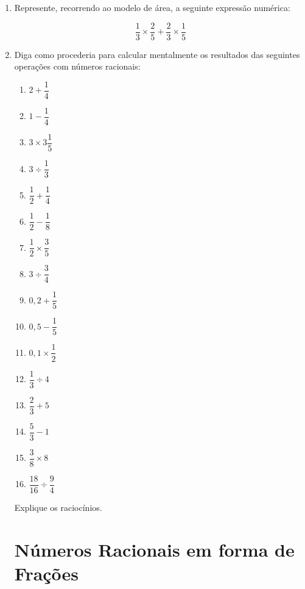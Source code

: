 \begin{enumerate}
\begin{minipage}[h]{14cm}
\begin{center}

\end{center}
\end{minipage}

\item Represente, recorrendo ao modelo de área, a seguinte expressão numérica:

$$\dfrac{1}{3}\times \dfrac{2}{5}+\dfrac{2}{3}\times \dfrac{1}{5}$$

\item Diga como procederia para calcular mentalmente os resultados das seguintes operações com números racionais:
\begin{multicols}{4}
\begin{enumerate}
    \item $2+\dfrac{1}{4}$
    \item $1-\dfrac{1}{4}$
    \item $3\times 3\dfrac{1}{5}$
    \item $3 \div \dfrac{1}{3}$
    \item $\dfrac{1}{2}+\dfrac{1}{4}$
    \item $\dfrac{1}{2}-\dfrac{1}{8}$
    \item $\dfrac{1}{2}\times \dfrac{3}{5}$
    \item $3\div\dfrac{3}{4}$
    \item $0,2+\dfrac{1}{5}$
    \item $0,5-\dfrac{1}{5}$
    \item $0,1\times \dfrac{1}{2}$
    \item $\dfrac{1}{3}\div 4$
    \item $\dfrac{2}{3}+5$
    \item $\dfrac{5}{3}-1$
    \item $\dfrac{3}{8}\times 8$
    \item $\dfrac{18}{16}\div\dfrac{9}{4}$
\end{enumerate}
\end{multicols}

Explique os raciocínios.

\section{Números Racionais em forma de Frações}


\end{enumerate}
